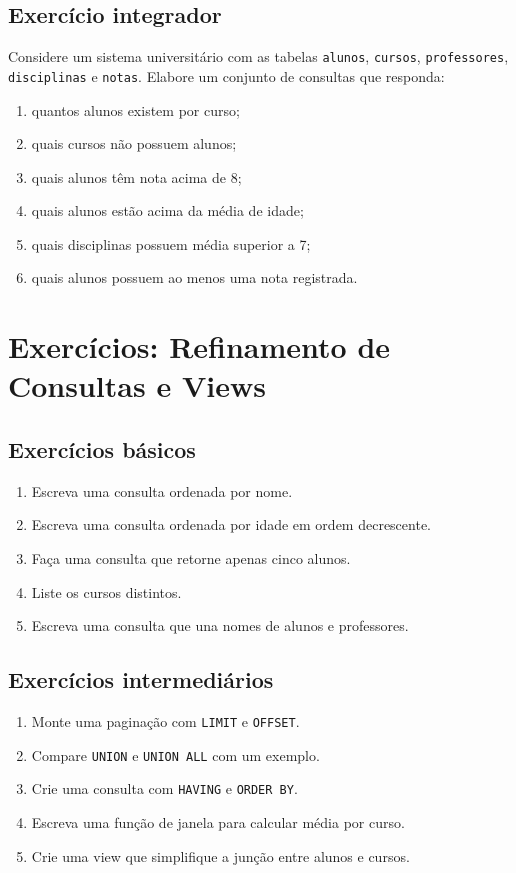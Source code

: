 \subsection{Exercício integrador}

Considere um sistema universitário com as tabelas \texttt{alunos}, \texttt{cursos}, \texttt{professores}, \texttt{disciplinas} e \texttt{notas}. Elabore um conjunto de consultas que responda:

\begin{enumerate}
    \item quantos alunos existem por curso;
    \item quais cursos não possuem alunos;
    \item quais alunos têm nota acima de 8;
    \item quais alunos estão acima da média de idade;
    \item quais disciplinas possuem média superior a 7;
    \item quais alunos possuem ao menos uma nota registrada.
\end{enumerate}



\section{Exercícios: Refinamento de Consultas e Views}
\subsection{Exercícios básicos}

\begin{enumerate}
    \item Escreva uma consulta ordenada por nome.
    \item Escreva uma consulta ordenada por idade em ordem decrescente.
    \item Faça uma consulta que retorne apenas cinco alunos.
    \item Liste os cursos distintos.
    \item Escreva uma consulta que una nomes de alunos e professores.
\end{enumerate}

\subsection{Exercícios intermediários}

\begin{enumerate}
    \item Monte uma paginação com \texttt{LIMIT} e \texttt{OFFSET}.
    \item Compare \texttt{UNION} e \texttt{UNION ALL} com um exemplo.
    \item Crie uma consulta com \texttt{HAVING} e \texttt{ORDER BY}.
    \item Escreva uma função de janela para calcular média por curso.
    \item Crie uma view que simplifique a junção entre alunos e cursos.
\end{enumerate}

